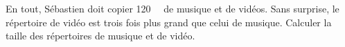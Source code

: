 
\begin{exercice}\label{exo2smath-0243}

    En tout, Sébastien doit copier \SI{120}{\giga\byte} de musique et de vidéos. Sans surprise, le répertoire de vidéo est trois fois plus grand que celui de musique. Calculer la taille des répertoires de musique et de vidéo.

\end{exercice}
